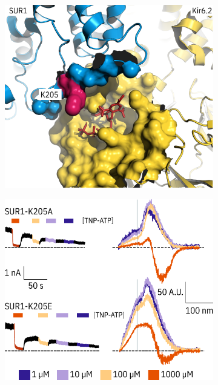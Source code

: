 \begin{figure}[h]
	\centering
	\begin{subfigure}[t]{0.45\textwidth}
		\caption{}\label{ch6fig:k205_1}
		\centering
		\includegraphics[width=\textwidth]{k205_1.pdf}
	\end{subfigure}
	\hfill
	\begin{subfigure}[t]{0.45\textwidth}
		\caption{}\label{ch6fig:k205_2}
		\centering
		\includegraphics[width=\textwidth]{k205_2.pdf}

\end{subfigure}
\end{figure}
